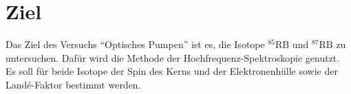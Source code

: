 \section{Ziel}
\label{sec:Ziel}

Das Ziel des Versuchs \enquote{Optisches Pumpen} ist es, die Isotope ${}^{85}\text{RB}$ und ${}^{87}\text{RB}$ zu untersuchen.
Dafür wird die Methode der Hochfrequenz-Spektroskopie genutzt.
Es soll für beide Isotope der Spin des Kerns und der Elektronenhülle sowie der Landé-Faktor bestimmt werden.